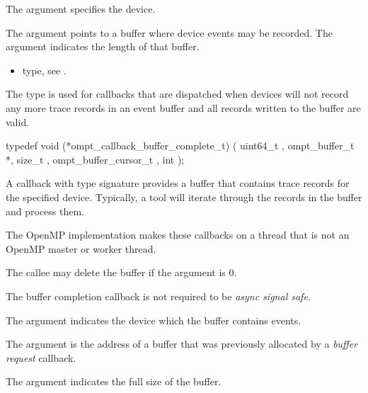 \argdesc
The  argument specifies the device.

The  argument points to a buffer where device events may be 
recorded. The  argument indicates the length of that buffer.

\crossreferences
\begin{itemize}
\item {} type, see .
\end{itemize}



\label{sec:ompt_callback_buffer_complete_t}

\summary
The  type is used for callbacks that are
dispatched when devices will not record any more trace records in an event buffer 
and all records written to the buffer are valid.

\format
\begin{ccppspecific}
\begin{omptCallback}
typedef void (*ompt_callback_buffer_complete_t) (
  uint64_t ,
  ompt_buffer_t *,
  size_t ,
  ompt_buffer_cursor_t ,
  int 
);
\end{omptCallback}
\end{ccppspecific}

\descr
A callback with type signature  provides 
a buffer that contains trace records for the specified device. Typically, a tool 
will iterate through the records in the buffer and process them.

The OpenMP implementation makes these callbacks on a thread that is not an 
OpenMP master or worker thread.

The callee may delete the buffer if the  argument is 0.

The buffer completion callback is not required to be \emph{async signal safe}.

\argdesc
The  argument indicates the device which the buffer contains events.

The  argument is the address of a buffer that was previously
allocated by a \emph{buffer request} callback.

The  argument indicates the full size of the buffer.

